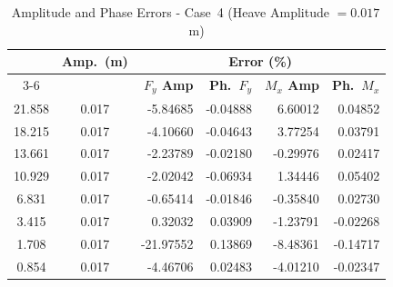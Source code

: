 \documentclass[../main]{subfiles}
\begin{document}
\begin{table}[htbp]
\centering
\caption{Amplitude and Phase Errors - Case~4 (Heave Amplitude $= 0.017$\,m)}
\label{tab:err_case4}
\renewcommand{\arraystretch}{1.25}
\begin{tabular}{|c|c|r|r|r|r|}
\hline
\rule{0pt}{12pt}
\multirow{2}{*}{\textbf{$U_r$}} &
\multirow{2}{*}{\textbf{Amp.\ (m)}} &
\multicolumn{4}{c|}{\textbf{Error (\%)}} \\[2pt]
\cline{3-6}
\rule{0pt}{10pt} & &
\textbf{$F_y$ Amp} &
\textbf{Ph.\ $F_y$} &
\textbf{$M_x$ Amp} &
\textbf{Ph.\ $M_x$} \\[4pt]
\hline
21.858 & 0.017 &  -5.84685 & -0.04888 &  6.60012 &  0.04852 \\
18.215 & 0.017 &  -4.10660 & -0.04643 &  3.77254 &  0.03791 \\
13.661 & 0.017 &  -2.23789 & -0.02180 & -0.29976 &  0.02417 \\
10.929 & 0.017 &  -2.02042 & -0.06934 &  1.34446 &  0.05402 \\
 6.831 & 0.017 &  -0.65414 & -0.01846 & -0.35840 &  0.02730 \\
 3.415 & 0.017 &   0.32032 &  0.03909 & -1.23791 & -0.02268 \\
 1.708 & 0.017 & -21.97552 &  0.13869 & -8.48361 & -0.14717 \\
 0.854 & 0.017 &  -4.46706 &  0.02483 & -4.01210 & -0.02347 \\
\hline
\end{tabular}
\end{table}

\FloatBarrier
\end{document}
